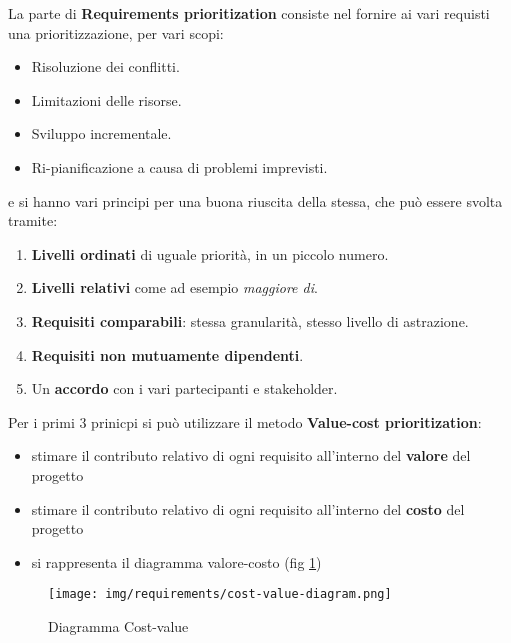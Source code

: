 La parte di \textbf{Requirements prioritization} consiste nel fornire ai vari
requisti una prioritizzazione, per vari scopi:
\begin{itemize}
      \item Risoluzione dei conflitti.
      \item Limitazioni delle risorse.
      \item Sviluppo incrementale.
      \item Ri-pianificazione a causa di problemi imprevisti.
\end{itemize}
e si hanno vari principi per una buona riuscita della stessa, che può essere
svolta tramite:
\begin{enumerate}
      \item \textbf{Livelli ordinati} di uguale priorità, in un piccolo numero.
      \item \textbf{Livelli relativi} come ad esempio \textit{maggiore di}.
      \item \textbf{Requisiti comparabili}: stessa granularità, stesso livello di
            astrazione.
      \item \textbf{Requisiti non mutuamente dipendenti}.
      \item Un \textbf{accordo} con i vari partecipanti e stakeholder.
\end{enumerate}
Per i primi 3 prinicpi si può utilizzare il metodo \textbf{Value-cost	prioritization}:
\begin{itemize}
      \item stimare il contributo relativo di ogni requisito all'interno del
            \textbf{valore} del progetto
      \item stimare il contributo relativo di ogni requisito all'interno del
            \textbf{costo} del progetto
      \item si rappresenta il diagramma valore-costo (fig \ref{fig:cost-value-diagram})
\end{itemize}

\begin{figure}[!ht]
      \centering
      \texttt{[image: img/requirements/cost-value-diagram.png]}
      \caption{Diagramma Cost-value}
      \label{fig:cost-value-diagram}
\end{figure}

